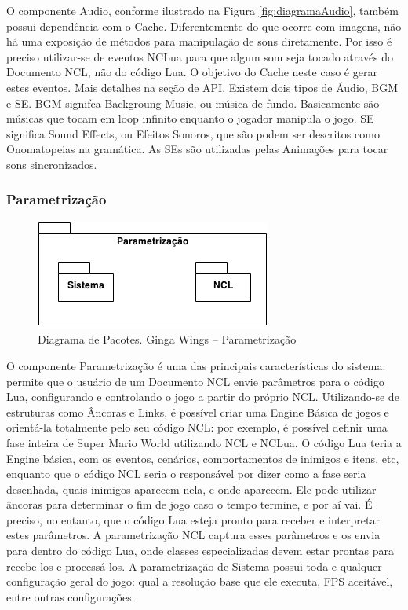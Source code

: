 \documentclass[
	12pt,				%
	openright,			%
	oneside,			%
	a4paper,			%
	brazil,				%
	]{abntex2}
\begin{document}
O componente Audio, conforme ilustrado na Figura \ref{fig:diagramaAudio}, também possui dependência com o Cache. Diferentemente do que ocorre com imagens, não há uma exposição de métodos para manipulação de sons diretamente. Por isso é preciso utilizar-se de eventos NCLua para que algum som seja tocado através do Documento NCL, não do código Lua. O objetivo do Cache neste caso é gerar estes eventos. Mais detalhes na seção de API. Existem dois tipos de Áudio, BGM e SE. BGM signifca Backgroung Music, ou música de fundo. Basicamente são músicas que tocam em loop infinito enquanto o jogador manipula o jogo. SE significa Sound Effects, ou Efeitos Sonoros, que são podem ser descritos como Onomatopeias na gramática. As SEs são utilizadas pelas Animações para tocar sons sincronizados.

\subsubsection{Parametrização}

\begin{figure}
\centering
\includegraphics{diagrama_parametrizacao.png}
\caption{Diagrama de Pacotes. Ginga Wings – Parametrização}
\label{fig:diagramaParametrizacao}
\end{figure}

O componente Parametrização é uma das principais características do sistema: permite que o usuário de um Documento NCL envie parâmetros para o código Lua, configurando e controlando o jogo a partir do próprio NCL. Utilizando-se de estruturas como Âncoras e Links, é possível criar uma Engine Básica de jogos e orientá-la totalmente pelo seu código NCL: por exemplo, é possível definir uma fase inteira de Super Mario World utilizando NCL e NCLua. O código Lua teria a Engine básica, com os eventos, cenários, comportamentos de inimigos e itens, etc, enquanto que o código NCL seria o responsável por dizer como a fase seria desenhada, quais inimigos aparecem nela, e onde aparecem. Ele pode utilizar âncoras para determinar o fim de jogo caso o tempo termine, e por aí vai. É preciso, no entanto, que o código Lua esteja pronto para receber e interpretar estes parâmetros. A parametrização NCL captura esses parâmetros e os envia para dentro do código Lua, onde classes especializadas devem estar prontas para recebe-los e processá-los. A parametrização de Sistema possui toda e qualquer configuração geral do jogo: qual a resolução base que ele executa, FPS aceitável, entre outras configurações. 
\end{document}
